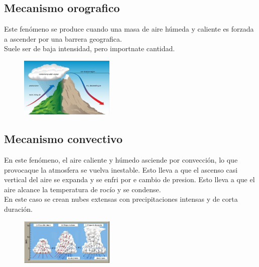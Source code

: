 \begin{figure}[!htbp]
\begin{minipage}{0.35\textwidth}
        \label{fig:frente_caliente}
    \end{minipage}
\end{figure}

\newpage
\subsection{Mecanismo orografico}

Este fenómeno se produce cuando una masa de aire húmeda y caliente es forzada a ascender por una barrera geografica.\\
Suele ser de baja intensidad, pero importnate cantidad.\\

\begin{figure}[h]
    \centering
    \includegraphics[width=0.4\textwidth]{imagenes/pp_orografica.png}
    \label{pp_orografica}
\end{figure}

\subsection{Mecanismo convectivo}   

En este fenómeno, el aire caliente y húmedo asciende por convección, lo que provocaque la atmosfera se vuelva inestable. Esto lleva a que el ascenso casi vertical del aire se expanda y se enfri por e cambio de presion. Esto lleva a que el aire alcance la temperatura de rocío y se condense.\\
En este caso se crean nubes extensas con precipitaciones intensas y de corta duración.\\

\begin{figure}[h]
    \centering
    \includegraphics[width=0.4\textwidth]{imagenes/pp_convectiva.png}
    \label{pp_convectiva}
\end{figure}

